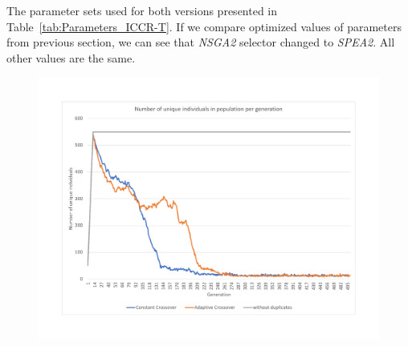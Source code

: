 The parameter sets used for both versions presented in Table~\ref{tab:Parameters_ICCR-T}. If we compare optimized values of parameters from previous section, we can see that \textit{NSGA2} selector changed to \textit{SPEA2}. All other values are the same.

\begin{table}
	\centering
	\caption{Parameters of ICCR and ICCR-T versions of the genetic solver}\label{tab:Parameters_ICCR-T}
\end{table}


\begin{figure}
	\centering
	\includegraphics[width=\textwidth]{images/UniqIndividualsPerGeneration3.pdf}
	\caption[]{}
	\label{fig:UniqIndividualsPerGeneration3}
\end{figure} 


